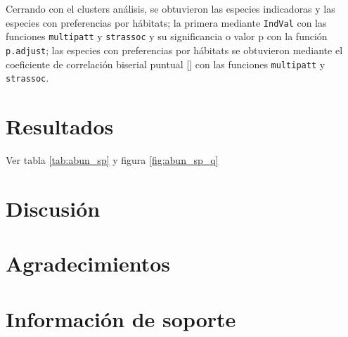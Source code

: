 \documentclass[11pt,]{article}
\begin{document}
Cerrando con el clusters análisis, se obtuvieron las especies
indicadoras y las especies con preferencias por hábitats; la primera
mediante \texttt{IndVal} con las funciones \texttt{multipatt} y
\texttt{strassoc} y su significancia o valor p con la función
\texttt{p.adjust}; las especies con preferencias por hábitats se
obtuvieron mediante el coeficiente de correlación biserial puntual
{[}{]} con las funciones \texttt{multipatt} y \texttt{strassoc}.

\section{Resultados}\label{resultados}

Ver tabla \ref{tab:abun_sp} y figura \ref{fig:abun_sp_q}

\section{Discusión}\label{discusiuxf3n}

\section{Agradecimientos}\label{agradecimientos}

\section{Información de soporte}\label{informaciuxf3n-de-soporte}
\end{document}
